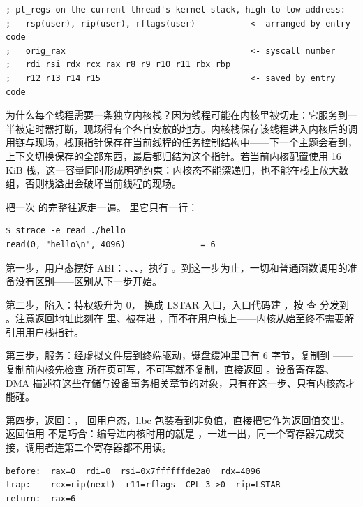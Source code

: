 \begin{lstlisting}
; pt_regs on the current thread's kernel stack, high to low address:
;   rsp(user), rip(user), rflags(user)           <- arranged by entry code
;   orig_rax                                     <- syscall number
;   rdi rsi rdx rcx rax r8 r9 r10 r11 rbx rbp
;   r12 r13 r14 r15                              <- saved by entry code
\end{lstlisting}

为什么每个线程需要一条独立内核栈？因为线程可能在内核里被切走：它服务到一半被定时器打断，现场得有个各自安放的地方。内核栈保存该线程进入内核后的调用链与现场，栈顶指针保存在当前线程的任务控制结构中——下一个主题会看到，上下文切换保存的全部东西，最后都归结为这个指针。若当前内核配置使用 16 KiB 栈，这一容量同时形成明确约束：内核态不能深递归，也不能在栈上放大数组，否则栈溢出会破坏当前线程的现场。

把一次  的完整往返走一遍。 里它只有一行：

\begin{lstlisting}
$ strace -e read ./hello
read(0, "hello\n", 4096)               = 6
\end{lstlisting}

第一步，用户态摆好 ABI：、、、，执行 。到这一步为止，一切和普通函数调用的准备没有区别——区别从下一步开始。

第二步，陷入：特权级升为 0， 换成 LSTAR 入口，入口代码建 ，按  查  分发到 。注意返回地址此刻在  里、被存进 ，而不在用户栈上——内核从始至终不需要解引用用户栈指针。

第三步，服务：经虚拟文件层到终端驱动，键盘缓冲里已有 6 字节，复制到 ——复制前内核先检查  所在页可写，不可写就不复制，直接返回 。设备寄存器、DMA 描述符这些存储与设备事务相关章节的对象，只有在这一步、只有内核态才能碰。

第四步，返回：， 回用户态，libc 包装看到非负值，直接把它作为返回值交出。返回值用  不是巧合：编号进内核时用的就是 ，一进一出，同一个寄存器完成交接，调用者连第二个寄存器都不用读。

\begin{lstlisting}
before:  rax=0  rdi=0  rsi=0x7ffffffde2a0  rdx=4096
trap:    rcx=rip(next)  r11=rflags  CPL 3->0  rip=LSTAR
return:  rax=6
\end{lstlisting}

